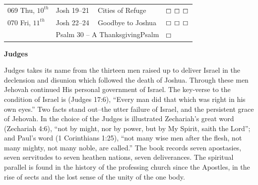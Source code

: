 \documentclass[10pt,landscape,twocolumn,letterpaper]{article}
\begin{document}
\begin{tabular}{p{0.75in}p{0.65in}p{1.8in}p{0.55in}}
\tiny 069 \normalsize  \textcolor[rgb]{0.00,0.00,1.00}{Thu, $10^{th}$} & \textcolor[rgb]{0.00,0.00,1.00}{Josh 19--21} & \textcolor[rgb]{0.50,0.50,0.50}{\small Cities of Refuge} & $\boxempty$ $\boxempty$ $\boxempty$\\

\tiny 070 \normalsize  \textcolor[rgb]{0.00,0.00,1.00}{Fri, $11^{th}$} & \textcolor[rgb]{0.00,0.00,1.00}{Josh 22--24} & \textcolor[rgb]{0.50,0.50,0.50}{\small Goodbye to Joshua} &  $\boxempty$ $\boxempty$ $\boxempty$\\
     & \multicolumn{2}{l}{\textcolor[rgb]{1.00,0.00,0.00}{Psalm 30 -- A ThanksgivingPsalm}} & $\boxempty$ \\
\end{tabular}

\newpage
\begin{center}
\textbf{Judges}
\end{center}
Judges takes its name from the thirteen men raised up to deliver Israel in the declension and disunion which followed the death of Joshua. Through these men Jehovah continued His personal government of Israel. The key-verse to the condition of Israel is (Judges 17:6), ``Every man did that which was right in his own eyes.'' Two facts stand out--the utter failure of Israel, and the persistent grace of Jehovah. In the choice of the Judges is illustrated Zechariah's great word (Zechariah 4:6), ``not by might, nor by power, but by My Spirit, saith the Lord''; and Paul's word (1 Corinthians 1:25), ``not many wise men after the flesh, not many mighty, not many noble, are called.'' The book records seven apostasies, seven servitudes to seven heathen nations, seven deliverances. The spiritual parallel is found in the history of the professing church since the Apostles, in the rise of sects and the lost sense of the unity of the one body.
\end{document}
